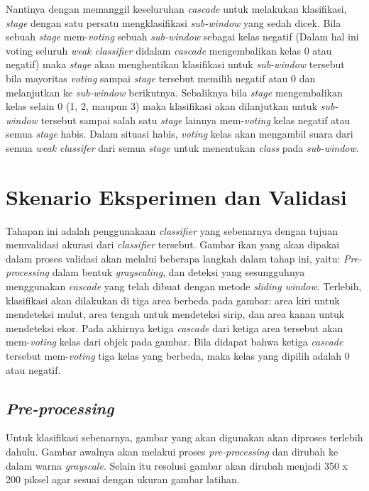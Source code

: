Nantinya dengan memanggil keseluruhan \textit{cascade} untuk melakukan 
klasifikasi, \textit{stage} dengan satu persatu mengklasifikasi 
\textit{sub-window} yang sedah dicek. Bila sebuah \textit{stage} 
mem-\textit{voting} sebuah \textit{sub-window} sebagai kelas negatif 
(Dalam hal ini voting seluruh \textit{weak classifier} didalam \textit{cascade} 
mengembalikan kelas 0 atau negatif) maka \textit{stage} akan menghentikan 
klasifikasi untuk \textit{sub-window} tersebut bila mayoritas \textit{voting} 
sampai \emph{stage} tersebut memilih negatif atau 0 dan melanjutkan ke 
\textit{sub-window} berikutnya. Sebaliknya bila \textit{stage} mengembalikan 
kelas selain 0 (1, 2, maupun 3) maka klasifikasi akan dilanjutkan 
untuk \textit{sub-window} tersebut sampai salah satu \textit{stage} lainnya 
mem-\textit{voting} kelas negatif atau semua \textit{stage} habis. 
Dalam situasi habis, \textit{voting} kelas akan mengambil suara dari semua 
\textit{weak classifer} dari semua \textit{stage} untuk menentukan \emph{class} 
pada \textit{sub-window}.


\section{Skenario Eksperimen dan Validasi}

Tahapan ini adalah penggunakaan \emph{classifier} yang sebenarnya dengan tujuan 
memvalidasi akurasi dari \emph{classifier} tersebut. 
Gambar ikan yang akan dipakai dalam proses validasi akan 
melalui beberapa langkah dalam tahap ini, 
yaitu: \textit{Pre-processing} dalam bentuk \emph{grayscaling}, 
dan deteksi yang sesungguhnya menggunakan \emph{cascade} 
yang telah dibuat dengan metode \textit{sliding window}. Terlebih, klasifikasi akan dilakukan di 
tiga area berbeda pada gambar: area kiri untuk mendeteksi mulut, area tengah untuk mendeteksi sirip, 
dan area kanan untuk mendeteksi ekor. Pada akhirnya ketiga \textit{cascade} 
dari ketiga area tersebut akan mem-\textit{voting} kelas dari objek pada gambar. 
Bila didapat bahwa ketiga \textit{cascade} tersebut mem-\textit{voting} tiga 
kelas yang berbeda, maka kelas yang dipilih adalah 0 atau negatif. 

\subsection{\textit{Pre-processing}}

Untuk klasifikasi sebenarnya, gambar yang akan digunakan 
akan diproses terlebih dahulu. 
Gambar awalnya akan melakui proses \textit{pre-processing} dan dirubah ke dalam warna 
\emph{grayscale}. %
Selain itu resolusi gambar akan dirubah menjadi 350 x 200 piksel agar sesuai 
dengan ukuran gambar latihan.

